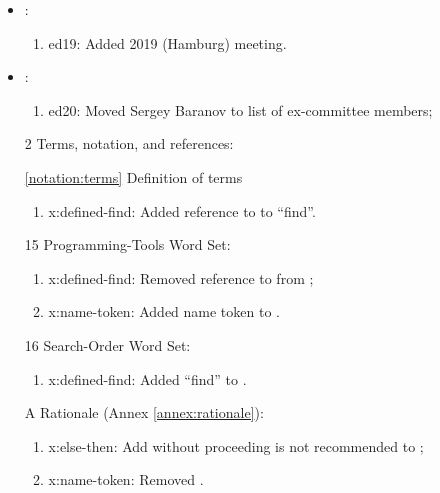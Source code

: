 	\begin{itemize}
	\item {}:					%
	\begin{enumerate}
		\item \textsf{ed19}: Added 2019 (Hamburg) meeting.
	\end{enumerate}

	\item {}:					%
	\begin{enumerate}
		\item \textsf{ed20}: Moved Sergey Baranov to list of ex-committee members;
	\end{enumerate}

	\item[2] Terms, notation, and references:	%
	\item[\ref{notation:terms}] Definition of terms
	\begin{enumerate}
	\item \textsf{x:defined-find}: Added reference to  to ``find''.
	\end{enumerate}

	\item[15] Programming-Tools Word Set:	%
	\begin{enumerate}
	\item \textsf{x:defined-find}: Removed reference to  from ;
	\item \textsf{x:name-token}: Added name token to .
	\end{enumerate}

	\item[16] Search-Order Word Set:		%
	\begin{enumerate}
	\item \textsf{x:defined-find}: Added ``find'' to .
	\end{enumerate}

	\item[A] Rationale (Annex \ref{annex:rationale}):	%
	\begin{enumerate}
	\item \textsf{x:else-then}: Add \word[tools]{[ELSE]} without proceeding \word[tools]{[IF]} is not
		recommended to ;
	\item \textsf{x:name-token}: Removed .
	\end{enumerate}
\end{itemize}

